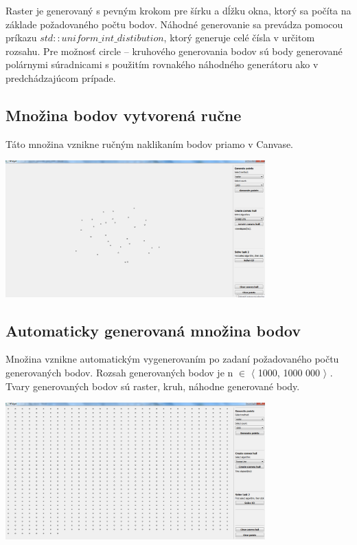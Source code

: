 \documentclass[12pt]{article}
\begin{document}
Raster je generovaný s pevným krokom pre šírku a dĺžku okna, ktorý sa počíta na základe požadovaného počtu bodov. Náhodné generovanie sa prevádza pomocou príkazu $std::uniform\_int\_distibution$, ktorý generuje celé čísla v určitom rozsahu. Pre možnosť circle -- kruhového generovania bodov sú body generované polárnymi súradnicami s použitím rovnakého náhodného generátoru ako v predchádzajúcom prípade.

\subsection{Množina bodov vytvorená ručne}
Táto množina vznikne ručným naklikaním bodov priamo v Canvase.

\begin{center}
   \includegraphics[width=10cm]{./img/points_manual.png}
\end{center}


\subsection{Automaticky generovaná množina bodov}
Množina vznikne automatickým vygenerovaním po zadaní požadovaného počtu generovaných bodov. Rozsah generovaných bodov je  n $\in$ $\langle$ 1000, 1000 000 $\rangle$ . Tvary generovaných bodov sú raster, kruh, náhodne generované body.

\begin{center}
   \includegraphics[width=10cm]{./img/points_generate_grid_1000.png}
\end{center}
\end{document}
